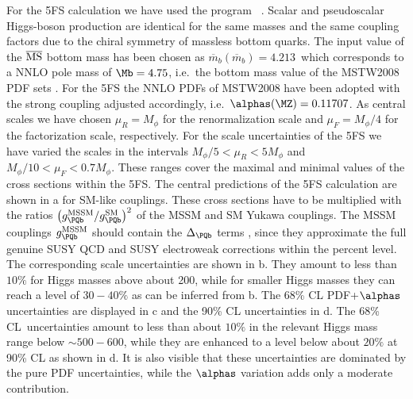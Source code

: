 For the 5FS calculation we have used the program \bbhnnlo~\cite{Harlander:2003ai}. 
Scalar and pseudoscalar Higgs-boson production
are identical for the same masses and the same coupling factors due to
the chiral symmetry of massless bottom quarks.  The input value of the
$\overline{\rm MS}$ bottom mass has been chosen as
$\overline{m}_b(\overline{m}_b)=4.213$\UGeV~which corresponds to a NNLO
pole mass of $\Mb=4.75$\UGeV, i.e.~the bottom mass value of the MSTW2008
PDF sets \cite{Martin:2009iq,Martin:2009bu}. For the 5FS the NNLO PDFs
of MSTW2008 have been adopted with the strong coupling adjusted
accordingly, i.e.~$\alphas(\MZ)=0.11707$. As central scales we have
chosen $\mu_R=M_\phi$ for the renormalization scale and $\mu_F=M_\phi/4$
for the factorization scale, respectively. For the scale uncertainties
of the 5FS we have varied the scales in the intervals $M_\phi/5 < \mu_R
< 5 M_\phi$ and $M_\phi/10 < \mu_F <0.7 M_\phi$. These ranges
cover the maximal and minimal values of the cross sections within the
5FS. The central predictions of the 5FS calculation are shown in
a for SM-like couplings. These cross
sections have to be multiplied with the ratios
$\left(g_{\PQb}^{\mathrm{MSSM}}/g_{\PQb}^{\mathrm{SM}}\right)^2$ of the MSSM and SM Yukawa
couplings. The MSSM couplings $g_{\PQb}^{\mathrm{MSSM}}$ should contain the
$\Delta_{\PQb}$
terms \cite{Hall:1993gn,Hempfling:1993kv, Carena:1994bv,Pierce:1996zz,
Carena:1999py,Guasch:2003cv,Noth:2008tw,Noth:2010jy,Mihaila:2010mp}, 
since they approximate the full
genuine SUSY QCD \cite{Hafliger:2006zz,Walser:2008zz} and
SUSY electroweak \cite{Dittmaier:2006cz}
corrections within the percent level. The corresponding scale
uncertainties are shown in b. They
amount to less than $10\%$ for Higgs masses above about 200\UGeV, while for
smaller Higgs masses they can reach a level of $30{-}40\%$ as can be
inferred from b. The 68\% CL
PDF+$\alphas$ uncertainties are displayed in
c and the 90\% CL uncertainties in
d. The 68\% CL~uncertainties amount
to less than about $10\%$ in the relevant Higgs mass range below $\sim
500{-}600$\UGeV, while they are enhanced to a level below about $20\%$ at
90\% CL as shown in d. It is also
visible that these uncertainties are dominated by the pure PDF
uncertainties, while the $\alphas$ variation adds only a moderate
contribution.
